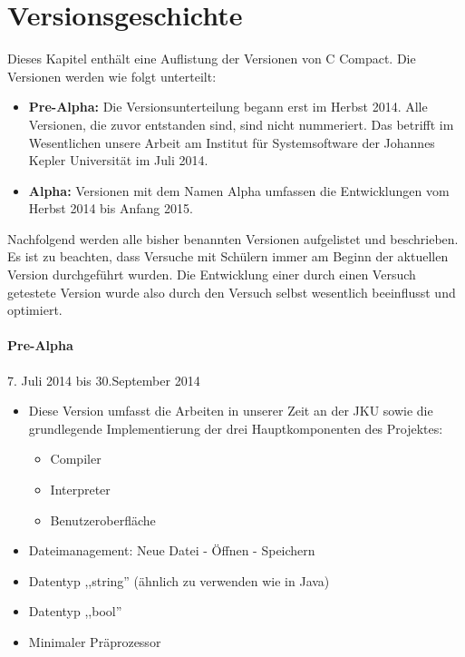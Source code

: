 

\chapter{Versionsgeschichte}
Dieses Kapitel enthält eine Auflistung der Versionen von C Compact. Die Versionen werden wie folgt unterteilt:
\begin{itemize}
\item \textbf{Pre-Alpha:} Die Versionsunterteilung begann erst im Herbst 2014. Alle Versionen, die zuvor entstanden sind, sind nicht nummeriert. Das betrifft im Wesentlichen unsere Arbeit am Institut für Systemsoftware der Johannes Kepler Universität im Juli 2014.
\item \textbf{Alpha:} Versionen mit dem Namen Alpha umfassen die Entwicklungen vom Herbst 2014 bis Anfang 2015.
\end{itemize}

Nachfolgend werden alle bisher benannten Versionen aufgelistet und beschrieben. Es ist zu beachten, dass Versuche mit Schülern immer am Beginn der aktuellen Version durchgeführt wurden. Die Entwicklung einer durch einen Versuch getestete Version wurde also durch den Versuch selbst wesentlich beeinflusst und optimiert.

\subsubsection*{Pre-Alpha}
7. Juli 2014 bis 30.September 2014
\begin{itemize}
\item Diese Version umfasst die Arbeiten in unserer Zeit an der JKU sowie die grundlegende Implementierung der drei Hauptkomponenten des Projektes:
\begin{itemize}
\item Compiler
\item Interpreter
\item Benutzeroberfläche
\end{itemize}
\item Dateimanagement: Neue Datei - Öffnen - Speichern
\item Datentyp ,,string'' (ähnlich zu verwenden wie in Java)
\item Datentyp ,,bool''
\item Minimaler Präprozessor
\end{itemize}

